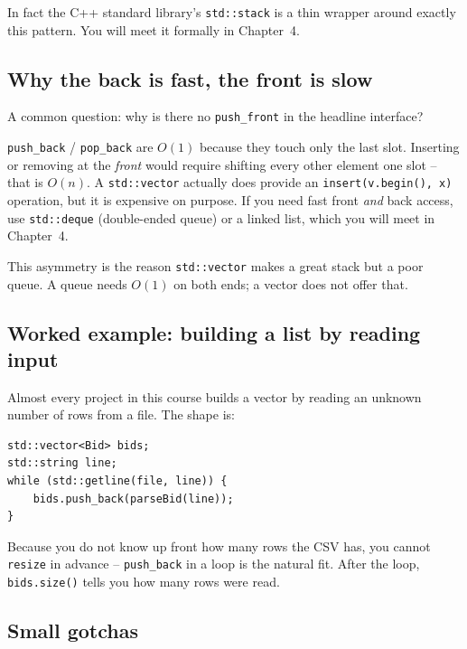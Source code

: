 \documentclass[11pt]{article}
\begin{document}
In fact the C++ standard library's \texttt{std::stack} is a thin
wrapper around exactly this pattern. You will meet it formally in
Chapter~4.

\subsection{Why the back is fast, the front is slow}

A common question: why is there no \texttt{push\_front} in the
headline interface?

\begin{ideabox}
\texttt{push\_back} / \texttt{pop\_back} are $O(1)$ because they
touch only the last slot. Inserting or removing at the \emph{front}
would require shifting every other element one slot -- that is
$O(n)$. A \texttt{std::vector} actually does provide an
\texttt{insert(v.begin(), x)} operation, but it is expensive on
purpose. If you need fast front \emph{and} back access, use
\texttt{std::deque} (double-ended queue) or a linked list, which you
will meet in Chapter~4.
\end{ideabox}

This asymmetry is the reason \texttt{std::vector} makes a great stack
but a poor queue. A queue needs $O(1)$ on both ends; a vector does
not offer that.

\subsection{Worked example: building a list by reading input}

\begin{examplebox}
Almost every project in this course builds a vector by reading an
unknown number of rows from a file. The shape is:
\begin{lstlisting}
std::vector<Bid> bids;
std::string line;
while (std::getline(file, line)) {
    bids.push_back(parseBid(line));
}
\end{lstlisting}
Because you do not know up front how many rows the CSV has, you
cannot \texttt{resize} in advance -- \texttt{push\_back} in a loop
is the natural fit. After the loop, \texttt{bids.size()} tells you
how many rows were read.
\end{examplebox}

\subsection{Small gotchas}
\end{document}

